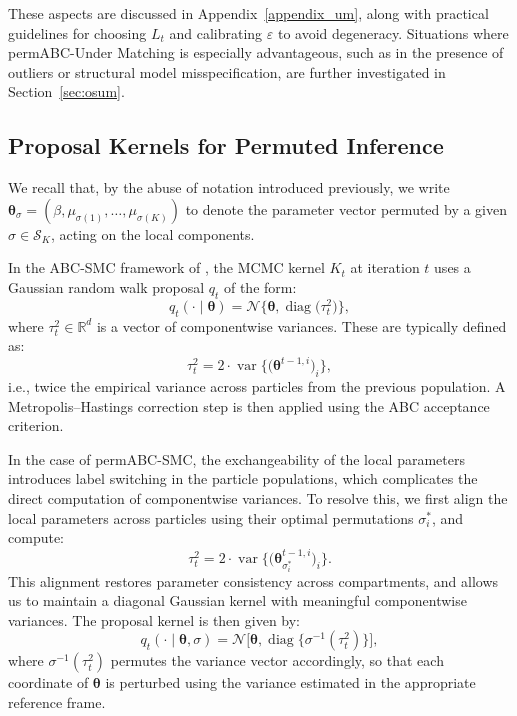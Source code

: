\documentclass[11pt,a4paper]{article}
\def\globparam{\beta}
\def\locparam{\mu}
\def\param{\boldsymbol{\theta}}
\theoremstyle{plain}
\theoremstyle{definition}
\theoremstyle{remark}
\begin{document}
These aspects are discussed in Appendix~\ref{appendix_um}, along with practical guidelines for choosing \( L_t \) and calibrating \( \varepsilon \) to avoid degeneracy. Situations where permABC-Under Matching is especially advantageous, such as in the presence of outliers or structural model misspecification, are further investigated in Section~\ref{sec:osum}.

\subsection{Proposal Kernels for Permuted Inference}
\label{sec:kernels}


	
We recall that, by the abuse of notation introduced previously, we write \( \param_\sigma = (\globparam, \locparam_{\sigma(1)}, \dots, \locparam_{\sigma(K)}) \) to denote the parameter vector permuted by a given \( \sigma \in \mathcal{S}_K \), acting on the local components.


In the ABC-SMC framework of \citet{delmoralAdaptiveSequentialMonte2012}, the MCMC kernel \( K_t \) at iteration \( t \) uses a Gaussian random walk proposal \( q_t \) of the form:
\[
q_t(\cdot \mid \param) = \mathcal{N}\bigl\{\param, \operatorname{diag}\bigl(\tau_t^2\bigr)\bigr\},
\]
where \( \tau_t^2 \in \mathbb{R}^d \) is a vector of componentwise variances. These are typically defined as:
\[
\tau_t^2 = 2 \cdot \operatorname{var}\bigl\{\bigl(\param^{t-1,i}\bigr)_i\bigr\},
\]
i.e., twice the empirical variance across particles from the previous population. A Metropolis–Hastings correction step is then applied using the ABC acceptance criterion.

In the case of permABC-SMC, the exchangeability of the local parameters introduces label switching in the particle populations, which complicates the direct computation of componentwise variances. To resolve this, we first align the local parameters across particles using their optimal permutations \( \sigma_i^* \), and compute:
\[
\tau_t^2 = 2 \cdot \operatorname{var}\bigl\{\bigl(\param_{\sigma_i^*}^{t-1,i}\bigr)_i\bigr\}.
\]
This alignment restores parameter consistency across compartments, and allows us to maintain a diagonal Gaussian kernel with meaningful componentwise variances. The proposal kernel is then given by:
\[
q_t(\cdot \mid \param, \sigma) = \mathcal{N}\bigl[\param, \operatorname{diag}\bigl\{\sigma^{-1}(\tau_t^2)\bigr\}\bigr],
\]
where \( \sigma^{-1}(\tau_t^2) \) permutes the variance vector accordingly, so that each coordinate of \( \param \) is perturbed using the variance estimated in the appropriate reference frame.
\end{document}
